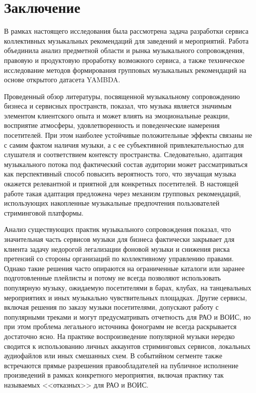 \chapter*{Заключение}

В рамках настоящего исследования была рассмотрена задача разработки сервиса коллективных музыкальных рекомендаций для заведений и мероприятий. Работа объединила анализ предметной области и рынка музыкального сопровождения, правовую и продуктовую проработку возможного сервиса, а также техническое исследование методов формирования групповых музыкальных рекомендаций на основе открытого датасета YAMBDA.

Проведенный обзор литературы, посвященной музыкальному сопровождению бизнеса и сервисных пространств, показал, что музыка является значимым элементом клиентского опыта и может влиять на эмоциональные реакции, восприятие атмосферы, удовлетворенность и поведенческие намерения посетителей. При этом наиболее устойчивые положительные эффекты связаны не с самим фактом наличия музыки, а с ее субъективной привлекательностью для слушателя и соответствием контексту пространства. Следовательно, адаптация музыкального потока под фактический состав аудитории может рассматриваться как перспективный способ повысить вероятность того, что звучащая музыка окажется релевантной и приятной для конкретных посетителей. В настоящей работе такая адаптация предложена через механизм групповых рекомендаций, использующих накопленные музыкальные предпочтения пользователей стриминговой платформы.

Анализ существующих практик музыкального сопровождения показал, что значительная часть сервисов музыки для бизнеса фактически закрывает для клиента задачу недорогой легализации фоновой музыки и снижения риска претензий со стороны организаций по коллективному управлению правами. Однако такие решения часто опираются на ограниченные каталоги или заранее подготовленные плейлисты и потому не всегда позволяют использовать популярную музыку, ожидаемую посетителями в барах, клубах, на танцевальных мероприятиях и иных музыкально чувствительных площадках. Другие сервисы, включая решения по заказу музыки посетителями, допускают работу с популярными треками и могут предусматривать отчетность для РАО и ВОИС, но при этом проблема легального источника фонограмм не всегда раскрывается достаточно ясно. На практике воспроизведение популярной музыки нередко сводится к использованию личных аккаунтов стриминговых сервисов, локальных аудиофайлов или иных смешанных схем. В событийном сегменте также встречаются прямые разрешения правообладателей на публичное исполнение произведений в рамках конкретного мероприятия, включая практику так называемых <<отказных>> для РАО и ВОИС.

